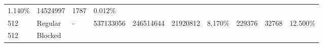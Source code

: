 \documentclass[11pt]{article}
\begin{document}
\begin{longtable}[]{@{}llllllllll@{}}
\begin{minipage}[t]{0.07\columnwidth}
1.140\%\strut
\end{minipage} & \begin{minipage}[t]{0.06\columnwidth}\raggedright\strut
14524997\strut
\end{minipage} & \begin{minipage}[t]{0.07\columnwidth}\raggedright\strut
1787\strut
\end{minipage} & \begin{minipage}[t]{0.07\columnwidth}\raggedright\strut
0.012\%\strut
\end{minipage}\tabularnewline
\begin{minipage}[t]{0.09\columnwidth}\raggedright\strut
512\strut
\end{minipage} & \begin{minipage}[t]{0.06\columnwidth}\raggedright\strut
Regular\strut
\end{minipage} & \begin{minipage}[t]{0.09\columnwidth}\raggedright\strut
-\strut
\end{minipage} & \begin{minipage}[t]{0.07\columnwidth}\raggedright\strut
537133056\strut
\end{minipage} & \begin{minipage}[t]{0.06\columnwidth}\raggedright\strut
246514644\strut
\end{minipage} & \begin{minipage}[t]{0.07\columnwidth}\raggedright\strut
21920812\strut
\end{minipage} & \begin{minipage}[t]{0.07\columnwidth}\raggedright\strut
8.170\%\strut
\end{minipage} & \begin{minipage}[t]{0.06\columnwidth}\raggedright\strut
229376\strut
\end{minipage} & \begin{minipage}[t]{0.07\columnwidth}\raggedright\strut
32768\strut
\end{minipage} & \begin{minipage}[t]{0.07\columnwidth}\raggedright\strut
12.500\%\strut
\end{minipage}\tabularnewline
\begin{minipage}[t]{0.09\columnwidth}\raggedright\strut
512\strut
\end{minipage} & \begin{minipage}[t]{0.06\columnwidth}\raggedright\strut
Blocked\strut
\end{minipage} & \begin{minipage}[t]{0.09\columnwidth}\raggedright\strut

\end{minipage}
\end{longtable}
\end{document}
